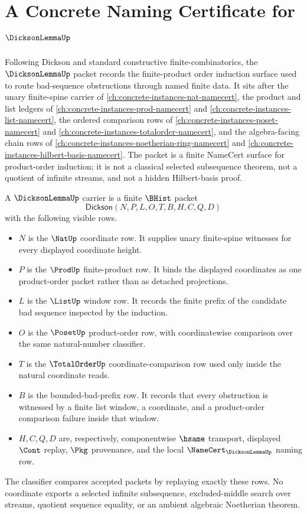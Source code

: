 \chapter{A Concrete Naming Certificate for $\DicksonLemmaUp$}
\label{ch:concrete-instances-dickson-lemma-namecert}

Following Dickson and standard constructive finite-combinatorics, the $\DicksonLemmaUp$ packet records the finite-product order induction surface used to route bad-sequence obstructions through named finite data. It sits after the unary finite-spine carrier of \autoref{ch:concrete-instances-nat-namecert}, the product and list ledgers of \autoref{ch:concrete-instances-prod-namecert} and \autoref{ch:concrete-instances-list-namecert}, the ordered comparison rows of \autoref{ch:concrete-instances-poset-namecert} and \autoref{ch:concrete-instances-totalorder-namecert}, and the algebra-facing chain rows of \autoref{ch:concrete-instances-noetherian-ring-namecert} and \autoref{ch:concrete-instances-hilbert-basis-namecert}. The packet is a finite NameCert surface for product-order induction; it is not a classical selected subsequence theorem, not a quotient of infinite streams, and not a hidden Hilbert-basis proof.

\begin{definition}\label{def:dickson-lemma-carrier}
A $\DicksonLemmaUp$ carrier is a finite $\BHist$ packet
$$
\mathsf{Dickson}(N,P,L,O,T,B,H,C,Q,D)
$$
with the following visible rows.
\begin{itemize}
\item $N$ is the $\NatUp$ coordinate row. It supplies unary finite-spine witnesses for every displayed coordinate height.
\item $P$ is the $\ProdUp$ finite-product row. It binds the displayed coordinates as one product-order packet rather than as detached projections.
\item $L$ is the $\ListUp$ window row. It records the finite prefix of the candidate bad sequence inspected by the induction.
\item $O$ is the $\PosetUp$ product-order row, with coordinatewise comparison over the same natural-number classifier.
\item $T$ is the $\TotalOrderUp$ coordinate-comparison row used only inside the natural coordinate reads.
\item $B$ is the bounded-bad-prefix row. It records that every obstruction is witnessed by a finite list window, a coordinate, and a product-order comparison failure inside that window.
\item $H,C,Q,D$ are, respectively, componentwise $\hsame$ transport, displayed $\Cont$ replay, $\Pkg$ provenance, and the local $\NameCert_{\DicksonLemmaUp}$ naming row.
\end{itemize}
The classifier compares accepted packets by replaying exactly these rows. No coordinate exports a selected infinite subsequence, excluded-middle search over streams, quotient sequence equality, or an ambient algebraic Noetherian theorem.
\end{definition}

